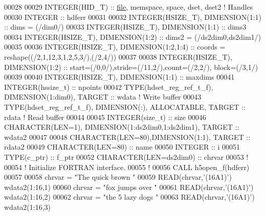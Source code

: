 \begin{DoxyCode}
00028 
00029   \textcolor{keywordtype}{INTEGER(HID\_T)}  :: \hyperlink{structfile}{file}, memspace, space, dset, dset2 \textcolor{comment}{! Handles}
00030   \textcolor{keywordtype}{INTEGER} :: hdferr
00031 
00032   \textcolor{keywordtype}{INTEGER(HSIZE\_T)}, \textcolor{keywordtype}{DIMENSION(1:1)}   :: dims = (/dim0/)
00033   \textcolor{keywordtype}{INTEGER(HSIZE\_T)}, \textcolor{keywordtype}{DIMENSION(1:1)}   :: dims3 
00034   \textcolor{keywordtype}{INTEGER(HSIZE\_T)}, \textcolor{keywordtype}{DIMENSION(1:2)}   :: dims2 = (/ds2dim0,ds2dim1/)
00035 
00036   \textcolor{keywordtype}{INTEGER(HSIZE\_T)}, \textcolor{keywordtype}{DIMENSION(1:2,1:4)} :: coords = reshape((/2,1,12,3,1,2,5,3/),(/2,4/))
00037   
00038   \textcolor{keywordtype}{INTEGER(HSIZE\_T)}, \textcolor{keywordtype}{DIMENSION(1:2)} :: start=(/0,0/),stride=(/11,2/),count=(/2,2/), block=(/3,1/)
00039 
00040   \textcolor{keywordtype}{INTEGER(HSIZE\_T)}, \textcolor{keywordtype}{DIMENSION(1:1)} :: maxdims
00041   \textcolor{keywordtype}{INTEGER(hssize\_t)} :: npoints
00042   \textcolor{keywordtype}{TYPE}(hdset\_reg\_ref\_t\_f), \textcolor{keywordtype}{DIMENSION(1:dim0)}, \textcolor{keywordtype}{TARGET} :: wdata \textcolor{comment}{! Write buffer}
00043   \textcolor{keywordtype}{TYPE}(hdset\_reg\_ref\_t\_f), \textcolor{keywordtype}{DIMENSION(:)}, \textcolor{keywordtype}{ALLOCATABLE}, \textcolor{keywordtype}{TARGET} :: rdata \textcolor{comment}{! Read buffer}
00044 
00045   \textcolor{keywordtype}{INTEGER(size\_t)} :: size
00046   \textcolor{keywordtype}{CHARACTER(LEN=1)}, \textcolor{keywordtype}{DIMENSION(1:ds2dim0,1:ds2dim1)}, \textcolor{keywordtype}{TARGET} :: wdata2
00047 
00048   \textcolor{keywordtype}{CHARACTER(LEN=80)},\textcolor{keywordtype}{DIMENSION(1:1)}, \textcolor{keywordtype}{TARGET} :: rdata2
00049   \textcolor{keywordtype}{CHARACTER(LEN=80)} :: name
00050   \textcolor{keywordtype}{INTEGER} :: i
00051   \textcolor{keywordtype}{TYPE}(c\_ptr) :: f\_ptr
00052   \textcolor{keywordtype}{CHARACTER(LEN=ds2dim0)} :: chrvar
00053   \textcolor{comment}{!}
00054   \textcolor{comment}{! Initialize FORTRAN interface.}
00055   \textcolor{comment}{!}
00056   \textcolor{keyword}{CALL }h5open\_f(hdferr)
00057 
00058   chrvar = \textcolor{stringliteral}{"The quick brown "}
00059   \textcolor{keyword}{READ}(chrvar,\textcolor{stringliteral}{'(16A1)'}) wdata2(1:16,1)
00060   chrvar = \textcolor{stringliteral}{"fox jumps over  "}
00061   \textcolor{keyword}{READ}(chrvar,\textcolor{stringliteral}{'(16A1)'}) wdata2(1:16,2)
00062   chrvar = \textcolor{stringliteral}{"the 5 lazy dogs "}
00063   \textcolor{keyword}{READ}(chrvar,\textcolor{stringliteral}{'(16A1)'}) wdata2(1:16,3)

\end{DoxyCode}
